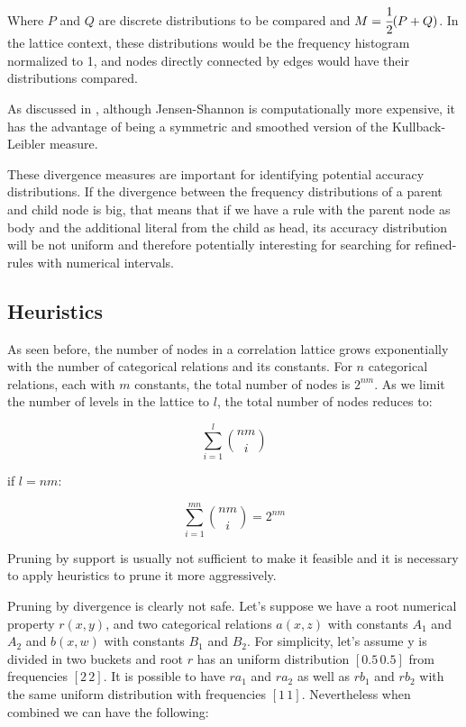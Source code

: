 Where $P$ and $Q$ are discrete distributions to be compared and $M=\cfrac{1}{2}(P+Q)$. In the lattice context, these
distributions would be the frequency histogram normalized to 1, and nodes directly connected by edges would have their
distributions compared.

As discussed in \cite{17795}, although Jensen-Shannon is computationally more expensive, it has the advantage of being a
symmetric and smoothed version of the Kullback-Leibler measure.

These divergence measures are important for identifying potential accuracy distributions. If the divergence between the
frequency distributions of a parent and child node is big, that means that if we have a rule with the parent node as
body and the additional literal from the child as head, its accuracy distribution will be not uniform and therefore
potentially interesting for searching for refined-rules with numerical intervals.


\subsection{Heuristics}
\label{sec:heuristics}

As seen before, the number of nodes in a correlation lattice grows exponentially with the number of categorical
relations and its constants. For $n$ categorical relations, each with $m$ constants, the total number of nodes is
$2^{nm}$. As we limit the number of levels in the lattice to $l$, the total number of nodes reduces to:

\begin{center}
  \begin{equation}
    \sum_{i=1}^{l}\binom{nm}{i}
  \end{equation}
\end{center}

if $l=nm$:

\begin{center}
  \begin{equation}
    \sum_{i=1}^{mn}\binom{nm}{i} = 2^{nm}
  \end{equation}
\end{center}


Pruning by support is usually not sufficient to make it feasible and it is necessary to apply
heuristics to prune it more aggressively.


Pruning by divergence is clearly not safe. Let's suppose we have a root numerical property $r(x,y)$, and two categorical
relations $a(x,z)$ with constants $A_1$ and $A_2$ and $b(x,w)$ with constants $B_1$ and $B_2$. For simplicity, let's
assume y is divided in two buckets and root $r$ has an uniform distribution $[0.5 \, 0.5]$ from frequencies $[2 \, 2]$.
It is possible to have $r a_1$ and $r a_2$ as well as $r b_1$ and $r b_2$ with the same uniform distribution with
frequencies $[1 \, 1]$. Nevertheless when combined we can have the following:

